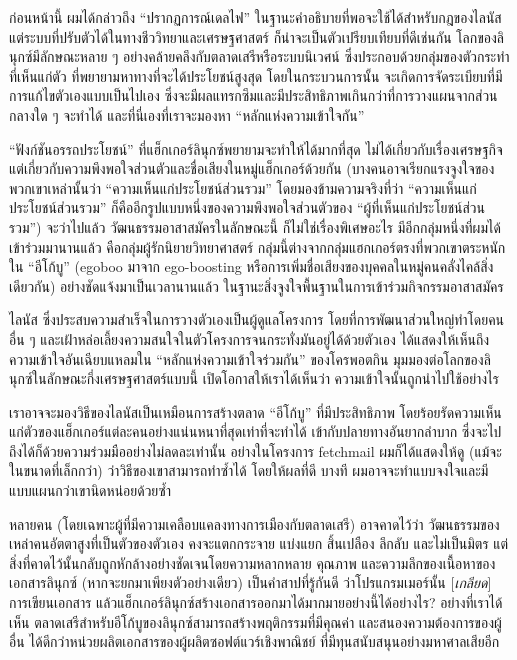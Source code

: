 ก่อนหน้านี้ ผมได้กล่าวถึง ``ปรากฏการณ์เดลไฟ''
ในฐานะคำอธิบายที่พอจะใช้ได้สำหรับกฎของไลนัส
แต่ระบบที่ปรับตัวได้ในทางชีววิทยาและเศรษฐศาสตร์
ก็น่าจะเป็นตัวเปรียบเทียบที่ดีเช่นกัน โลกของลินุกซ์มีลักษณะหลาย ๆ
อย่างคล้ายคลึงกับตลาดเสรีหรือระบบนิเวศน์
ซึ่งประกอบด้วยกลุ่มของตัวกระทำที่เห็นแก่ตัว
ที่พยายามหาทางที่จะได้ประโยชน์สูงสุด โดยในกระบวนการนั้น
จะเกิดการจัดระเบียบที่มีการแก้ไขตัวเองแบบเป็นไปเอง
ซึ่งจะมีผลแทรกซึมและมีประสิทธิภาพเกินกว่าที่การวางแผนจากส่วนกลางใด ๆ
จะทำได้ และที่นี่เองที่เราจะมองหา ``หลักแห่งความเข้าใจกัน''

``ฟังก์ชันอรรถประโยชน์'' ที่แฮ็กเกอร์ลินุกซ์พยายามจะทำให้ได้มากที่สุด
ไม่ได้เกี่ยวกับเรื่องเศรษฐกิจ
แต่เกี่ยวกับความพึงพอใจส่วนตัวและชื่อเสียงในหมู่แฮ็กเกอร์ด้วยกัน
(บางคนอาจเรียกแรงจูงใจของพวกเขาเหล่านั้นว่า
``ความเห็นแก่ประโยชน์ส่วนรวม'' โดยมองข้ามความจริงที่ว่า
``ความเห็นแก่ประโยชน์ส่วนรวม''
ก็คืออีกรูปแบบหนึ่งของความพึงพอใจส่วนตัวของ
``ผู้ที่เห็นแก่ประโยชน์ส่วนรวม'') จะว่าไปแล้ว
วัฒนธรรมอาสาสมัครในลักษณะนี้ ก็ไม่ใช่เรื่องพิเศษอะไร
มีอีกกลุ่มหนึ่งที่ผมได้เข้าร่วมมานานแล้ว คือกลุ่มผู้รักนิยายวิทยาศาสตร์
กลุ่มนี้ต่างจากกลุ่มแฮกเกอร์ตรงที่พวกเขาตระหนักใน ``อีโก้บู'' (egoboo
มาจาก ego-boosting
หรือการเพิ่มชื่อเสียงของบุคคลในหมู่คนคลั่งไคล้สิ่งเดียวกัน)
อย่างชัดแจ้งมาเป็นเวลานานแล้ว
ในฐานะสิ่งจูงใจพื้นฐานในการเข้าร่วมกิจกรรมอาสาสมัคร

ไลนัส ซึ่งประสบความสำเร็จในการวางตัวเองเป็นผู้ดูแลโครงการ
โดยที่การพัฒนาส่วนใหญ่ทำโดยคนอื่น ๆ
และเฝ้าหล่อเลี้ยงความสนใจในตัวโครงการจนกระทั่งมันอยู่ได้ด้วยตัวเอง
ได้แสดงให้เห็นถึงความเข้าใจอันเฉียบแหลมใน ``หลักแห่งความเข้าใจร่วมกัน''
ของโครพอตกิน มุมมองต่อโลกของลินุกซ์ในลักษณะกึ่งเศรษฐศาสตร์แบบนี้
เปิดโอกาสให้เราได้เห็นว่า ความเข้าใจนั้นถูกนำไปใช้อย่างไร

เราอาจจะมองวิธีของไลนัสเป็นเหมือนการสร้างตลาด ``อีโก้บู''
ที่มีประสิทธิภาพ
โดยร้อยรัดความเห็นแก่ตัวของแฮ็กเกอร์แต่ละคนอย่างแน่นหนาที่สุดเท่าที่จะทำได้
เข้ากับปลายทางอันยากลำบาก
ซึ่งจะไปถึงได้ก็ด้วยความร่วมมืออย่างไม่ลดละเท่านั้น อย่างในโครงการ
fetchmail ผมก็ได้แสดงให้ดู (แม้จะในขนาดที่เล็กกว่า)
ว่าวิธีของเขาสามารถทำซ้ำได้ โดยให้ผลที่ดี บางที
ผมอาจจะทำแบบจงใจและมีแบบแผนกว่าเขานิดหน่อยด้วยซ้ำ

หลายคน (โดยเฉพาะผู้ที่มีความเคลือบแคลงทางการเมืองกับตลาดเสรี)
อาจคาดไว้ว่า วัฒนธรรมของเหล่าคนอัตตาสูงที่เป็นตัวของตัวเอง คงจะแตกกระจาย
แบ่งแยก สิ้นเปลือง ลึกลับ และไม่เป็นมิตร
แต่สิ่งที่คาดไว้นั้นกลับถูกหักล้างอย่างชัดเจนโดยความหลากหลาย คุณภาพ
และความลึกของเนื้อหาของเอกสารลินุกซ์ (หากจะยกมาเพียงตัวอย่างเดียว)
เป็นคำสาปที่รู้กันดี ว่าโปรแกรมเมอร์นั้น {[}\emph{เกลียด}{]}
การเขียนเอกสาร
แล้วแฮ็กเกอร์ลินุกซ์สร้างเอกสารออกมาได้มากมายอย่างนี้ได้อย่างไร?
อย่างที่เราได้เห็น
ตลาดเสรีสำหรับอีโก้บูของลินุกซ์สามารถสร้างพฤติกรรมที่มีคุณค่า
และสนองความต้องการของผู้อื่น
ได้ดีกว่าหน่วยผลิตเอกสารของผู้ผลิตซอฟต์แวร์เชิงพาณิชย์
ที่มีทุนสนับสนุนอย่างมหาศาลเสียอีก

